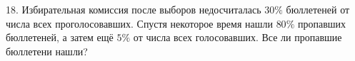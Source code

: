 18. Избирательная комиссия после выборов недосчиталась $30\%$ бюллетеней от числа всех
проголосовавших. Спустя некоторое время нашли $80\%$ пропавших бюллетеней, а затем
ещё $5\%$ от числа всех голосовавших. Все ли пропавшие бюллетени нашли? \\
